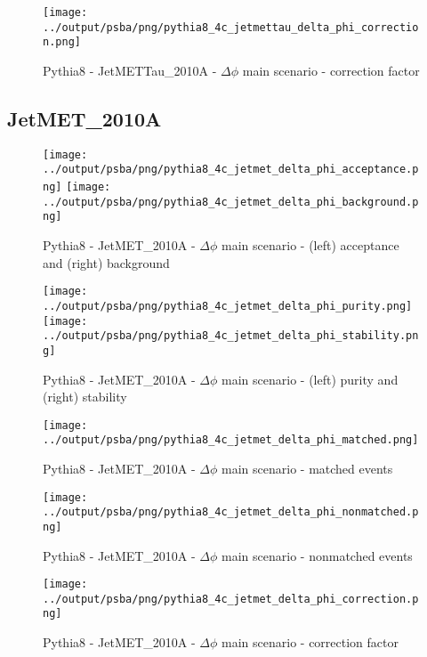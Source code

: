 \documentclass[11pt]{book}
\begin{document}
\begin{figure}[ht]
\centering
\texttt{[image: ../output/psba/png/pythia8\_4c\_jetmettau\_delta\_phi\_correction.png]}
\caption{Pythia8 - JetMETTau\_2010A - $\Delta\phi$ main scenario - correction factor}
\label{fig:p8_jetmettau_delta_phi_correction}
\end{figure}


\clearpage
\subsection{JetMET\_2010A}

\begin{figure}[ht]
\centering
\texttt{[image: ../output/psba/png/pythia8\_4c\_jetmet\_delta\_phi\_acceptance.png]}
\texttt{[image: ../output/psba/png/pythia8\_4c\_jetmet\_delta\_phi\_background.png]}
\caption{Pythia8 - JetMET\_2010A - $\Delta\phi$ main scenario - (left) acceptance and (right) background}
\label{fig:p8_jetmet_delta_phi_ab}
\end{figure}

\begin{figure}[ht]
\centering
\texttt{[image: ../output/psba/png/pythia8\_4c\_jetmet\_delta\_phi\_purity.png]}
\texttt{[image: ../output/psba/png/pythia8\_4c\_jetmet\_delta\_phi\_stability.png]}
\caption{Pythia8 - JetMET\_2010A - $\Delta\phi$ main scenario - (left) purity and (right) stability}
\label{fig:p8_jetmet_delta_phi_ps}
\end{figure}

\begin{figure}[ht]
\centering
\texttt{[image: ../output/psba/png/pythia8\_4c\_jetmet\_delta\_phi\_matched.png]}
\caption{Pythia8 - JetMET\_2010A - $\Delta\phi$ main scenario - matched events}
\label{fig:p8_jetmet_delta_phi_matched}
\end{figure}

\begin{figure}[ht]
\centering
\texttt{[image: ../output/psba/png/pythia8\_4c\_jetmet\_delta\_phi\_nonmatched.png]}
\caption{Pythia8 - JetMET\_2010A - $\Delta\phi$ main scenario - nonmatched events}
\label{fig:p8_jetmet_delta_phi_nonmatched}
\end{figure}

\begin{figure}[ht]
\centering
\texttt{[image: ../output/psba/png/pythia8\_4c\_jetmet\_delta\_phi\_correction.png]}
\caption{Pythia8 - JetMET\_2010A - $\Delta\phi$ main scenario - correction factor}
\label{fig:p8_jetmet_delta_phi_correction}
\end{figure}
\end{document}
